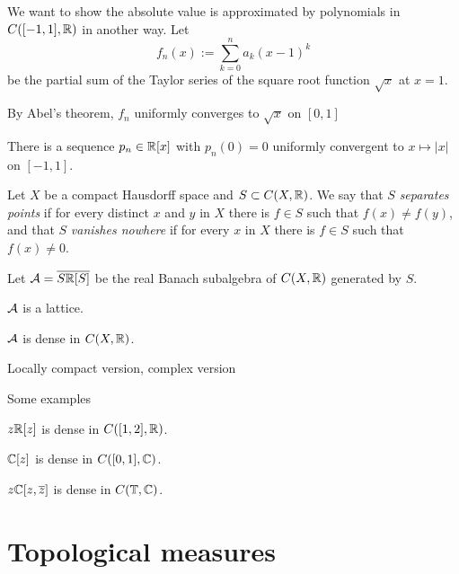 \documentclass{../../large}
\begin{document}
\begin{prb}
We want to show the absolute value is approximated by polynomials in $C([-1,1],\mathbb{R})$ in another way.
Let
\[f_n(x):=\sum_{k=0}^n a_k(x-1)^k\]
be the partial sum of the Taylor series of the square root function $\sqrt x$ at $x=1$.
\begin{parts}
\item By Abel's theorem, $f_n$ uniformly converges to $\sqrt x$ on $[0,1]$
\item There is a sequence $p_n\in\mathbb{R}[x]$ with $p_n(0)=0$ uniformly convergent to $x\mapsto|x|$ on $[-1,1]$.
\end{parts}
\end{prb}


\begin{prb}
Let $X$ be a compact Hausdorff space and $S\subset C(X,\mathbb{R})$.
We say that $S$ \emph{separates points} if for every distinct $x$ and $y$ in $X$ there is $f\in S$ such that $f(x)\ne f(y)$, and that $S$ \emph{vanishes nowhere} if for every $x$ in $X$ there is $f\in S$ such that $f(x)\ne0$.

Let $\mathcal{A}=\overline{S\mathbb{R}[S]}$ be the real Banach subalgebra of $C(X,\mathbb{R})$ generated by $S$.
\begin{parts}
\item $\mathcal{A}$ is a lattice.
\item $\mathcal{A}$ is dense in $C(X,\mathbb{R})$.
\end{parts}
\end{prb}




Locally compact version,
complex version








\begin{prb}
Some examples
\begin{parts}
\item $z\mathbb{R}[z]$ is dense in $C([1,2],\mathbb{R})$.
\item $\mathbb{C}[z]$ is dense in $C([0,1],\mathbb{C})$.
\item $z\mathbb{C}[z,\overline z]$ is dense in $C(\mathbb{T},\mathbb{C})$.
\end{parts}
\end{prb}












\chapter{Topological measures}
\end{document}
